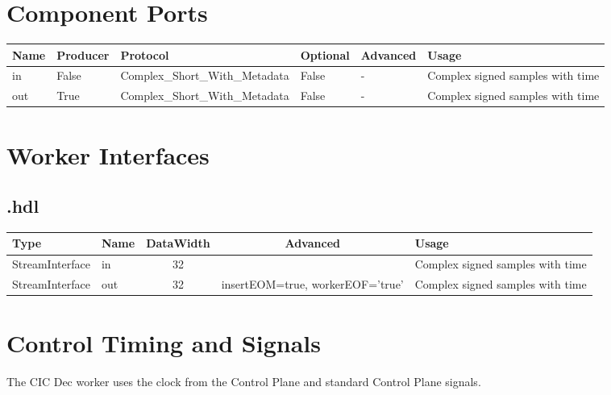 \begin{landscape}
	\section*{Component Ports}
	\begin{scriptsize}
		\begin{tabular}{|p{2cm}|p{1.5cm}|p{4cm}|p{1.5cm}|p{4.5cm}|p{5.75cm}|}
			\hline
			\rowcolor{blue}
			Name & Producer & Protocol           				& Optional & Advanced	& Usage                  \\
			\hline
			in   & False    & Complex\_Short\_With\_Metadata 	& False     & -    		& Complex signed samples with time \\
			\hline
			out  & True     & Complex\_Short\_With\_Metadata 	& False     & -			& Complex signed samples with time \\
			\hline
		\end{tabular}
	\end{scriptsize}

	\section*{Worker Interfaces}
	\subsection*{\comp.hdl}
	\begin{scriptsize}
		\begin{tabular}{|M{2cm}|M{1.5cm}|c|c|M{12cm}|}
			\hline
			\rowcolor{blue}
			Type            & Name & DataWidth & Advanced                			& Usage                  \\
			\hline
			StreamInterface & in   & 32        & 						   			& Complex signed samples with time \\
			\hline
			StreamInterface & out  & 32        & insertEOM=true, workerEOF='true' & Complex signed samples with time \\
			\hline
		\end{tabular}
	\end{scriptsize}
\end{landscape}

\section*{Control Timing and Signals}
\begin{flushleft}
	The CIC Dec worker uses the clock from the Control Plane and standard Control Plane signals.
\end{flushleft}


